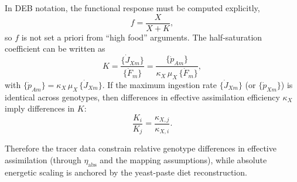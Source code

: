 \documentclass[11pt]{article}
\begin{document}
In DEB notation, the functional response must be computed explicitly,
\begin{equation}
  f = \frac{X}{X+K},
\end{equation}
so $f$ is not set a priori from ``high food'' arguments. The half-saturation coefficient can be written as
\begin{equation}
  K = \frac{\{\dot J_{Xm}\}}{\{\dot F_m\}} = \frac{\{\dot p_{Am}\}}{\kappa_X\,\mu_X\,\{\dot F_m\}},
\end{equation}
with $\{\dot p_{Am}\}=\kappa_X\,\mu_X\,\{\dot J_{Xm}\}$. If the maximum ingestion rate $\{\dot J_{Xm}\}$ (or $\{\dot p_{Xm}\}$) is identical across genotypes, then differences in effective assimilation efficiency $\kappa_X$ imply differences in $K$:
\begin{equation}
  \frac{K_i}{K_j} = \frac{\kappa_{X,j}}{\kappa_{X,i}}.
\end{equation}

Therefore the tracer data constrain relative genotype differences in effective assimilation (through $\eta_{\mathrm{abs}}$ and the mapping assumptions), while absolute energetic scaling is anchored by the yeast-paste diet reconstruction.
\end{document}
